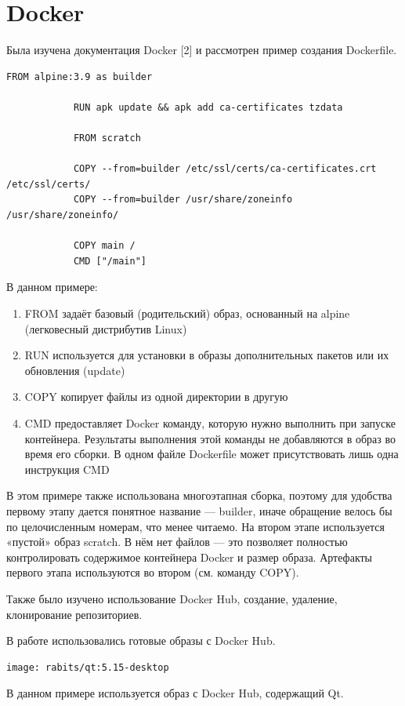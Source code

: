 \documentclass[a4paper,14pt]{extreport}
\begin{document}
		\section{Docker}
		Была изучена документация Docker [2] и рассмотрен пример создания 
		Dockerfile.
		\begin{lstlisting}[label=some-code,caption= пример Dockerfile]
			FROM alpine:3.9 as builder

			RUN apk update && apk add ca-certificates tzdata

			FROM scratch

			COPY --from=builder /etc/ssl/certs/ca-certificates.crt /etc/ssl/certs/
			COPY --from=builder /usr/share/zoneinfo /usr/share/zoneinfo/

			COPY main /
			CMD ["/main"]
		\end{lstlisting}
		В данном примере:
		\begin{enumerate}
			\item  FROM задаёт базовый (родительский) образ, основанный на 						alpine (легковесный дистрибутив Linux)
			\item RUN используется для установки в образы дополнительных 						пакетов  или их обновления (update)
			\item COPY копирует файлы из одной директории в другую
			\item CMD предоставляет Docker команду, которую нужно выполнить 					при  запуске контейнера. Результаты выполнения этой 							команды не добавляются в образ во время его сборки. В одном 					файле Dockerfile может присутствовать лишь одна инструкция 					CMD
		\end{enumerate}
		\par В этом примере также использована многоэтапная сборка, поэтому для 
удобства первому этапу дается понятное название — builder, иначе обращение 
велось бы по целочисленным номерам, что менее читаемо. На втором этапе 
используется «пустой» образ scratch. В нём нет файлов — это позволяет 
полностью контролировать содержимое контейнера Docker и размер образа.
Артефакты первого этапа используются во втором (см. команду COPY).
\par Также было изучено использование Docker Hub, создание, удаление, 
клонирование репозиториев. 
\par В работе использовались готовые образы с Docker Hub.
		\begin{lstlisting}[label=some-code,caption= пример использования образа с Docker Hub из .gitlab-ci.yml файла]
			image: rabits/qt:5.15-desktop
		\end{lstlisting}
\par В данном примере используется образ с Docker Hub, содержащий Qt.
\end{document}
